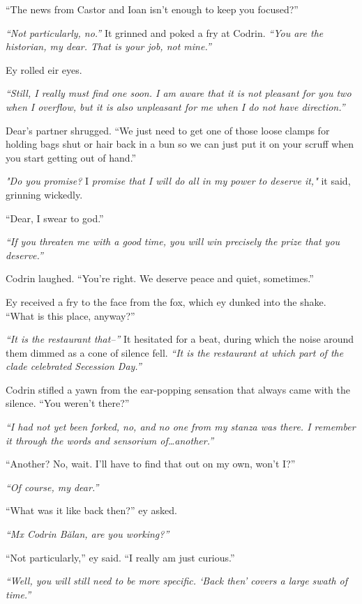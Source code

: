 ``The news from Castor and Ioan isn't enough to keep you focused?''

\emph{``Not particularly, no.''} It grinned and poked a fry at Codrin. \emph{``You are the historian, my dear. That is your job, not mine.''}

Ey rolled eir eyes.

\emph{``Still, I really must find one soon. I am aware that it is not pleasant for you two when I overflow, but it is also unpleasant for me when I do not have direction.''}

Dear's partner shrugged. ``We just need to get one of those loose clamps for holding bags shut or hair back in a bun so we can just put it on your scruff when you start getting out of hand.''

\emph{"Do you promise?} I \emph{promise that I will do all in my power to deserve it,"} it said, grinning wickedly.

``Dear, I swear to god.''

\emph{``If you threaten me with a good time, you will win precisely the prize that you deserve.''}

Codrin laughed. ``You're right. We deserve peace and quiet, sometimes.''

Ey received a fry to the face from the fox, which ey dunked into the shake. ``What is this place, anyway?''

\emph{``It is the restaurant that--''} It hesitated for a beat, during which the noise around them dimmed as a cone of silence fell. \emph{``It is the restaurant at which part of the clade celebrated Secession Day.''}

Codrin stifled a yawn from the ear-popping sensation that always came with the silence. ``You weren't there?''

\emph{``I had not yet been forked, no, and no one from my stanza was there. I remember it through the words and sensorium of\ldots another.''}

``Another? No, wait. I'll have to find that out on my own, won't I?''

\emph{``Of course, my dear.''}

``What was it like back then?'' ey asked.

\emph{``Mx Codrin Bălan, are you working?''}

``Not particularly,'' ey said. ``I really am just curious.''

\emph{``Well, you will still need to be more specific. `Back then' covers a large swath of time.''}

